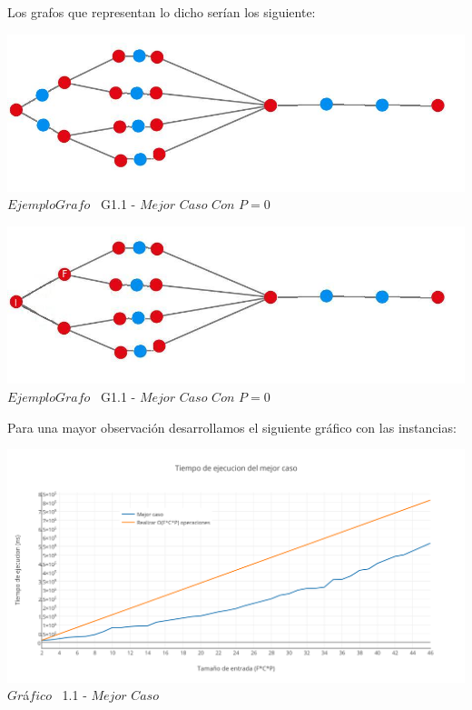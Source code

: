 Los grafos que representan lo dicho ser\'ian los siguiente:\\

\vspace*{0.3cm} \vspace*{0.3cm}
  \begin{center}
\includegraphics[scale=0.65]{./EJ1/ej1grafomejorcaso.jpeg}
{$Ejemplo Grafo$ \ G1.1 - $Mejor$ $Caso$ $Con$ $P=0$ }
  \end{center}
  \vspace*{0.3cm}

\vspace*{0.3cm} \vspace*{0.3cm}
  \begin{center}
\includegraphics[scale=0.65]{./EJ1/ej1grafomejorcaso2.jpeg}
{$Ejemplo Grafo$ \ G1.1 - $Mejor$ $Caso$ $Con$ $P=0$ }
  \end{center}
  \vspace*{0.3cm}

Para una mayor observaci\'on desarrollamos el siguiente gr\'afico con las instancias:\\

\vspace*{0.3cm} \vspace*{0.3cm}
  \begin{center}
 \includegraphics[scale=0.65]{./EJ1/mejorcaso.png}
 {$Gr$\'a$fico$ \ 1.1 - $Mejor$ $Caso$}
  \end{center}
  \vspace*{0.3cm}

